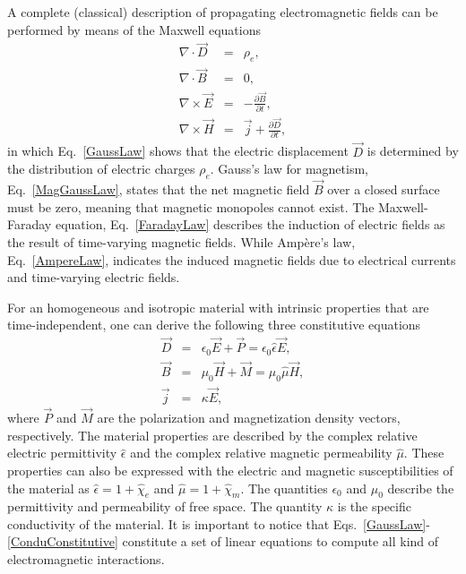 A complete (classical) description of propagating electromagnetic fields can be performed by means of the Maxwell equations\!\cite{Jackson1999}
\begin{eqnarray}
\nabla \cdot \vec{D} &=& \rho_e, \label{GaussLaw} \\
\nabla \cdot \vec{B} &=& 0, \label{MagGaussLaw} \\
\nabla \times \vec{E} &=& - \frac{\partial \vec{B}}{\partial t}, \label{FaradayLaw} \\
\nabla \times \vec{H} &=& \vec{j} + \frac{\partial \vec{D}}{\partial t}, \label{AmpereLaw}
\end{eqnarray}
\noindent in which Eq.\ \ref{GaussLaw} shows that the electric displacement $\vec{D}$ is determined by the distribution of electric charges $\rho_e$. Gauss's law for magnetism, Eq.\ \ref{MagGaussLaw}, states that the net magnetic field $\vec{B}$ over a closed surface must be zero, meaning that magnetic monopoles cannot exist. The Maxwell-Faraday equation, Eq.\ \ref{FaradayLaw} describes the induction of electric fields as the result of time-varying magnetic fields. While Amp\`ere's law, Eq.\ \ref{AmpereLaw}, indicates the induced magnetic fields due to electrical currents and time-varying electric fields. 


For an homogeneous and isotropic material with intrinsic properties that are time-independent, one can derive the following three constitutive equations
\begin{eqnarray}
\vec{D} &=& \epsilon_0 \vec{E} + \vec{P} = \epsilon_0 \hat{\epsilon} \vec{E}, \label{DtoE} \\
\vec{B} &=& \mu_0 \vec{H} + \vec{M} = \mu_0 \hat{\mu} \vec{H}, \label{HtoB} \\
\vec{j} &=& \kappa \vec{E}, \label{ConduConstitutive}
\end{eqnarray}
\noindent where $\vec{P}$ and $\vec{M}$ are the polarization and magnetization density vectors, respectively. The material properties are described by the complex relative electric permittivity $\hat{\epsilon}$ and the complex relative magnetic permeability $\hat{\mu}$. These properties can also be expressed with the electric and magnetic susceptibilities of the material as $\hat{\epsilon} = 1 + \hat{\chi}_e$ and $\hat{\mu} = 1 + \hat{\chi}_m$. The quantities $\epsilon_0$ and $\mu_0$ describe the permittivity and permeability of free space. The quantity $\kappa$ is the specific conductivity of the material. It is important to notice that Eqs.\ \ref{GaussLaw}-\ref{ConduConstitutive} constitute a set of linear equations to compute all kind of electromagnetic interactions.



